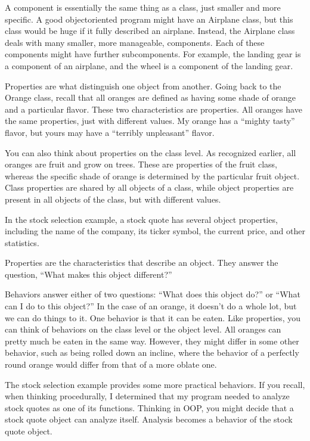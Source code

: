 A component is essentially the same thing as a class, just smaller and more specific. A good objectoriented program might have an Airplane class, but this class would be huge if it fully described an airplane. Instead, the Airplane class deals with many smaller, more manageable, components. Each of these components might have further subcomponents. For example, the landing gear is a component of an airplane, and the wheel is a component of the landing gear.


Properties are what distinguish one object from another. Going back to the Orange class, recall that all oranges are defined as having some shade of orange and a particular flavor. These two characteristics are properties. All oranges have the same properties, just with different values. My orange has a “mighty tasty” flavor, but yours may have a “terribly unpleasant” flavor.

You can also think about properties on the class level. As recognized earlier, all oranges are fruit and grow on trees. These are properties of the fruit class, whereas the specific shade of orange is determined by the particular fruit object. Class properties are shared by all objects of a class, while object properties are present in all objects of the class, but with different values.

In the stock selection example, a stock quote has several object properties, including the name of the company, its ticker symbol, the current price, and other statistics.

Properties are the characteristics that describe an object. They answer the question, “What makes this object different?”


Behaviors answer either of two questions: “What does this object do?” or “What can I do to this object?” In the case of an orange, it doesn’t do a whole lot, but we can do things to it. One behavior is that it can be eaten. Like properties, you can think of behaviors on the class level or the object level. All oranges can pretty much be eaten in the same way. However, they might differ in some other behavior, such as being rolled down an incline, where the behavior of a perfectly round orange would differ from that of a more oblate one.

The stock selection example provides some more practical behaviors. If you recall, when thinking procedurally, I determined that my program needed to analyze stock quotes as one of its functions. Thinking in OOP, you might decide that a stock quote object can analyze itself. Analysis becomes a behavior of the stock quote object.

